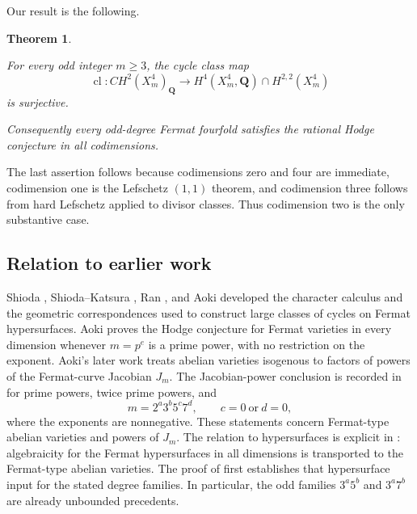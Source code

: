 \documentclass[11pt]{amsart}
\newtheorem{theorem}{Theorem}
\numberwithin{theorem}{section}
\theoremstyle{remark}
\numberwithin{equation}{section}
\begin{document}
Our result is the following.

\begin{theorem}\label{theorem:1.1}

For every odd integer \(m\ge3\), the cycle class map
\[
\operatorname{cl}\colon CH^2(X_m^4)_{\mathbf Q}\longrightarrow
H^4(X_m^4,\mathbf Q)\cap H^{2,2}(X_m^4)
\]
is surjective.

Consequently every odd-degree Fermat fourfold satisfies the rational Hodge
conjecture in all codimensions.
\end{theorem}

The last assertion follows because codimensions zero and four are immediate,
codimension one is the Lefschetz \((1,1)\) theorem, and codimension three follows
from hard Lefschetz applied to divisor classes. Thus codimension two is the only
substantive case.

\subsection{Relation to earlier work}\label{sec:1.1}

Shioda \cite{shioda1979}, Shioda--Katsura \cite[Theorem 1.7, pp.~101--102]{shiodakatsura1979}, Ran
\cite[pp.~138--140]{ran1980}, and Aoki \cite[Theorem 2-1, p.~388]{aoki1987} developed the character
calculus and the geometric correspondences used to construct large classes of
cycles on Fermat hypersurfaces. Aoki \cite[Corollary 2-3, p.~388]{aoki1987} proves the
Hodge conjecture for Fermat varieties in every dimension whenever
\(m=p^e\) is a prime power, with no restriction on the exponent.
Aoki's later work \cite[Theorem 0.1, p.~177]{aoki2000} treats abelian varieties
isogenous to factors of powers of the Fermat-curve Jacobian \(J_m\).
The Jacobian-power conclusion is recorded in
\cite[Theorem 1.2, p.~102]{aoki2002} for prime powers, twice prime powers, and
\[
m=2^a3^b5^c7^d,\qquad c=0\ \text{or}\ d=0,
\]
where the exponents are nonnegative. These statements concern
Fermat-type abelian varieties and powers of \(J_m\). The relation to
hypersurfaces is explicit in \cite[Corollary 3.2, p.~184]{aoki2000}: algebraicity
for the Fermat hypersurfaces in all dimensions is transported to the
Fermat-type abelian varieties. The proof of \cite[Theorem 0.1, p.~185]{aoki2000}
first establishes that hypersurface input for the stated degree families.
In particular, the odd families \(3^a5^b\) and \(3^a7^b\) are already
unbounded precedents.
\end{document}
